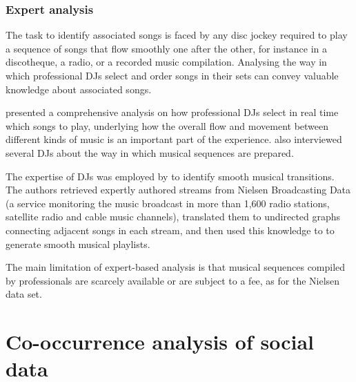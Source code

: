 \subsubsection{Expert analysis} %
\label{ssub:expert_based_smoothness}

The task to identify associated songs is faced by any disc jockey required to play a sequence of songs that flow smoothly one after the other, for instance in a discotheque, a radio, or a recorded music compilation.
Analysing the way in which professional DJs select and order songs in their sets can convey valuable knowledge about associated songs.

\citet{Weiss00} presented a comprehensive analysis on how professional DJs select in real time which songs to play, underlying how the overall flow and movement between different kinds of music is an important part of the experience.
\citet{Gates06} also interviewed several DJs about the way in which musical sequences are prepared.

The expertise of DJs was employed by \citet{Ragno05} to identify smooth musical transitions. 
The authors retrieved expertly authored streams from Nielsen Broadcasting Data (a service monitoring the music broadcast in more than 1,600 radio stations, satellite radio and cable music channels), translated them to undirected graphs connecting adjacent songs in each stream, and then used this knowledge to to generate smooth musical playlists.

The main limitation of expert-based analysis is that musical sequences compiled by professionals are scarcely available or are subject to a fee, as for the Nielsen data set.







\section{Co-occurrence analysis of social data} %
\label{sec:co_occurrence_analysis5}

